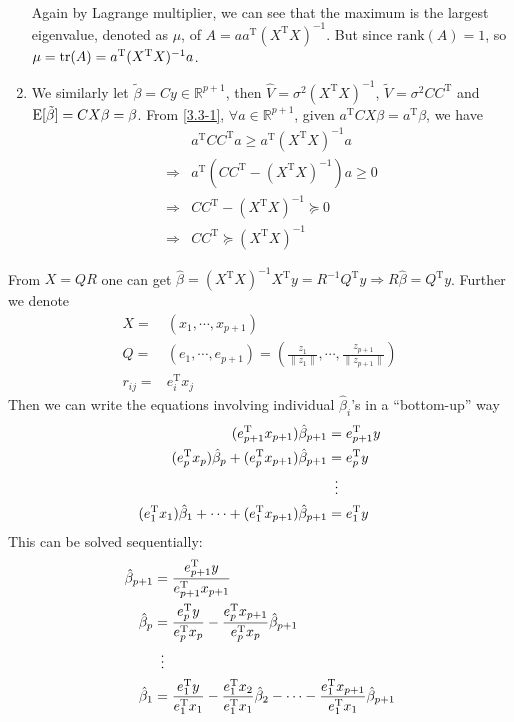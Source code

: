 \begin{sol}
\begin{enumerate}
\begin{align*}
\end{align*}
Again by Lagrange multiplier, we can see that the maximum is the largest eigenvalue, denoted as $\mu$, of $A=aa^{\mathrm{T}}(X^{\mathrm{T}}X)^{-1}$. But since $\mathrm{rank}(A)=1$, so $\mu=\operatorname{tr}(A)=a^{\mathrm{T}}(X^{\mathrm{T}}X)^{-1}a$.
\item We similarly let $\tilde{\beta}=Cy\in\mathbb{R}^{p+1}$, then $\hat{V}=\sigma^2(X^\mathrm{T}X)^{-1}$, $\tilde{V}=\sigma^2CC^{\mathrm{T}}$ and $\operatorname{E}[\tilde{\beta}]=CX\beta=\beta$. From \ref{3.3-1}, $\forall a\in\mathbb{R}^{p+1}$, given $a^{\mathrm{T}}CX\beta=a^{\mathrm{T}}\beta$, we have
\begin{align*}
& a^{\mathrm{T}}CC^{\mathrm{T}}a\ge a^{\mathrm{T}}(X^\mathrm{T}X)^{-1}a\\
\Longrightarrow & a^{\mathrm{T}}\left(CC^{\mathrm{T}}-(X^\mathrm{T}X)^{-1}\right)a\ge 0\\
\Longrightarrow & CC^{\mathrm{T}} - \left(X^\mathrm{T}X\right)^{-1} \succeq 0\\
\Longrightarrow & CC^{\mathrm{T}}\succeq \left(X^\mathrm{T}X\right)^{-1}
\end{align*}
\end{enumerate}
\end{sol}

\begin{sol}
From $X=QR$ one can get $\hat{\beta}=(X^\mathrm{T}X)^{-1}X^\mathrm{T}y=R^{-1}Q^\mathrm{T}y\Longrightarrow R\hat{\beta}=Q^\mathrm{T}y$. Further we denote
\begin{align*}
X =& (x_1,\cdots,x_{p+1})\\
Q =& (e_1,\cdots,e_{p+1})=(\frac{z_1}{\|z_1\|},\cdots,\frac{z_{p+1}}{\|z_{p+1}\|})\\
r_{ij} =& e_i^\mathrm{T}x_j
\end{align*}
Then we can write the equations involving individual $\hat{\beta}_i$'s in a ``bottom-up'' way
\begin{align*}
(e_{p+1}^\mathrm{T}x_{p+1})\hat{\beta}_{p+1} &= e_{p+1}^\mathrm{T}y\\
(e_{p}^\mathrm{T}x_{p})\hat{\beta}_{p} + (e_{p}^\mathrm{T}x_{p+1})\hat{\beta}_{p+1} &= e_{p}^\mathrm{T}y\\
&\vdotswithin{=}\\
(e_{1}^\mathrm{T}x_{1})\hat{\beta}_{1} + \cdots + (e_{1}^\mathrm{T}x_{p+1})\hat{\beta}_{p+1} &= e_{1}^\mathrm{T}y
\end{align*}
This can be solved sequentially:
\begin{align*}
\hat{\beta}_{p+1} &= \frac{e_{p+1}^\mathrm{T}y}{e_{p+1}^\mathrm{T}x_{p+1}}\\
\hat{\beta}_{p} &= \frac{e_{p}^\mathrm{T}y}{e_{p}^\mathrm{T}x_{p}}-\frac{e_{p}^\mathrm{T}x_{p+1}}{e_{p}^\mathrm{T}x_{p}}\hat{\beta}_{p+1}\\
&\vdotswithin{=}\\
\hat{\beta}_{1} &= \frac{e_{1}^\mathrm{T}y}{e_{1}^\mathrm{T}x_{1}}- \frac{e_{1}^\mathrm{T}x_{2}}{e_{1}^\mathrm{T}x_{1}}\hat{\beta}_{2} - \cdots - \frac{e_{1}^\mathrm{T}x_{p+1}}{e_{1}^\mathrm{T}x_{1}}\hat{\beta}_{p+1}
\end{align*}
\end{sol}

